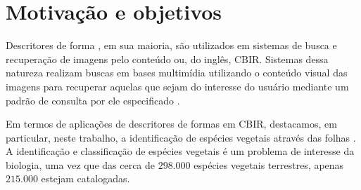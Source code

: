 





\section{Motivação e objetivos \label{sec:motiv_obj}}

Descritores de forma \cite{Belongie:2002, 1467513, Nanni20122254, Hu20123348, Latecki:2007, Wang2012134}, em sua maioria, são utilizados em sistemas de busca e recuperação de imagens pelo conteúdo ou, do inglês, \ac{CBIR}. Sistemas dessa natureza realizam buscas em bases multimídia utilizando o conteúdo visual das imagens para recuperar aquelas que sejam do interesse do usuário mediante um padrão de consulta por ele especificado \cite{Feng:2003}. 

Em termos de aplicações de descritores de formas em \ac{CBIR}, destacamos, em particular, neste trabalho, a identificação de espécies vegetais através das folhas \cite{deSouza2016,
Fotopoulou:2013,Zhao20153203, Nam2008245, Wang:2000}. A identificação e classificação de espécies vegetais é um problema de interesse da biologia, uma vez que das cerca de $298.000$ espécies vegetais terrestres, apenas $215.000$ \cite{MoraTittensorAdlEtAl2011} estejam catalogadas. 

